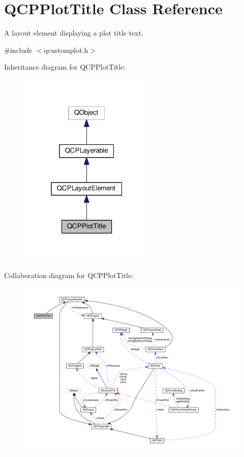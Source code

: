 \hypertarget{classQCPPlotTitle}{}\section{Q\+C\+P\+Plot\+Title Class Reference}
\label{classQCPPlotTitle}


A layout element displaying a plot title text.  




{\ttfamily \#include $<$qcustomplot.\+h$>$}



Inheritance diagram for Q\+C\+P\+Plot\+Title\+:\nopagebreak
\begin{figure}[H]
\begin{center}
\leavevmode
\includegraphics[width=184pt]{classQCPPlotTitle__inherit__graph}
\end{center}
\end{figure}


Collaboration diagram for Q\+C\+P\+Plot\+Title\+:\nopagebreak
\begin{figure}[H]
\begin{center}
\leavevmode
\includegraphics[width=350pt]{classQCPPlotTitle__coll__graph}
\end{center}
\end{figure}

